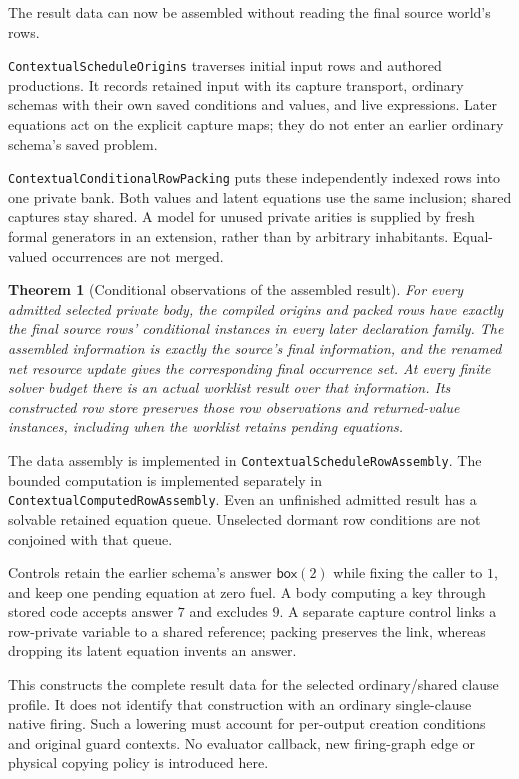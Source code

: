 \documentclass[11pt]{article}
\newtheorem{theorem}{Theorem}
\newcommand{\code}[1]{\texttt{\small #1}}
\begin{document}
The result data can now be assembled without reading the final source
world's rows.

\code{ContextualScheduleOrigins} traverses initial input
rows and authored productions. It records retained input with its capture
transport, ordinary schemas with their own saved conditions and values,
and live expressions. Later equations act on the explicit capture maps;
they do not enter an earlier ordinary schema's saved problem.

\code{ContextualConditionalRowPacking} puts these independently indexed
rows into one private bank. Both values and latent equations use the
same inclusion; shared captures stay shared. A model for unused private
arities is supplied by fresh formal generators in an extension, rather
than by arbitrary inhabitants. Equal-valued occurrences are not merged.

\begin{theorem}[Conditional observations of the assembled result]
For every admitted selected private body, the compiled origins and packed
rows have exactly the final source rows' conditional instances in every
later declaration family. The assembled information is exactly the
source's final information, and the renamed net resource update gives
the corresponding final occurrence set. At every finite solver budget
there is an actual worklist result over that information. Its constructed
row store preserves those row observations and returned-value instances,
including when the worklist retains pending equations.
\end{theorem}
The data assembly is implemented in \code{ContextualScheduleRowAssembly}.
The bounded computation is implemented separately in
\code{ContextualComputedRowAssembly}.
Even an unfinished admitted result has a solvable retained equation queue.
Unselected dormant row conditions are not conjoined with that queue.

Controls retain the earlier schema's answer $\mathsf{box}(2)$ while
fixing the caller to $1$, and keep one pending equation at zero fuel.
A body computing a key through stored code accepts answer $7$ and
excludes $9$. A separate capture control links a row-private variable
to a shared reference; packing preserves the link, whereas dropping
its latent equation invents an answer.

This constructs the complete result data for the selected ordinary/shared
clause profile. It does not identify that construction with an ordinary
single-clause native firing. Such a lowering must account for per-output
creation conditions and original guard contexts. No evaluator callback,
new firing-graph edge or physical copying policy is introduced here.
\end{document}
